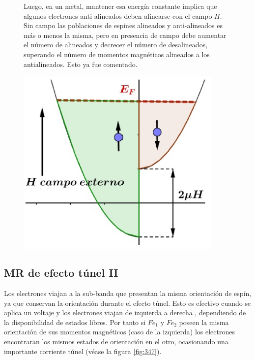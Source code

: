 \begin{figure}[H]
  \begin{minipage}[b]{0.47\textwidth}
Luego, en un metal, mantener esa energía constante implica que algunos electrones anti-alineados deben alinearse con el campo $H$. Sin campo las poblaciones de espines alineados y anti-alineados es más o menos la misma, pero en presencia de campo debe aumentar el número de alineados y decrecer el número de desalineados, superando el número de momentos magnéticos alineados a los antialineados. Esto ya fue comentado.
  \vspace{0cm}
  \end{minipage}
  \hfill
  \begin{minipage}[b]{0.47\textwidth}
     \includegraphics[width=0.9\textwidth]{./Figures/fig346}
	\label{fig:346}
	  \vspace{0.5cm}
  \end{minipage}
\end{figure}

\subsection{MR de efecto túnel II}

Los electrones viajan a la sub-banda que presentan la misma orientación de espín, ya que conservan la orientación durante el efecto túnel. Esto es efectivo cuando se aplica un voltaje y los electrones viajan de izquierda a derecha , dependiendo de la disponibilidad de estados libres. Por tanto si $Fe_{1}$ y $Fe_{2}$ poseen la misma orientación de sus momentos magnéticos (caso de la izquierda) los electrones encontraran los mismos estados de orientación en el otro, ocasionando una importante corriente túnel (véase la figura \ref{fig:347}).

